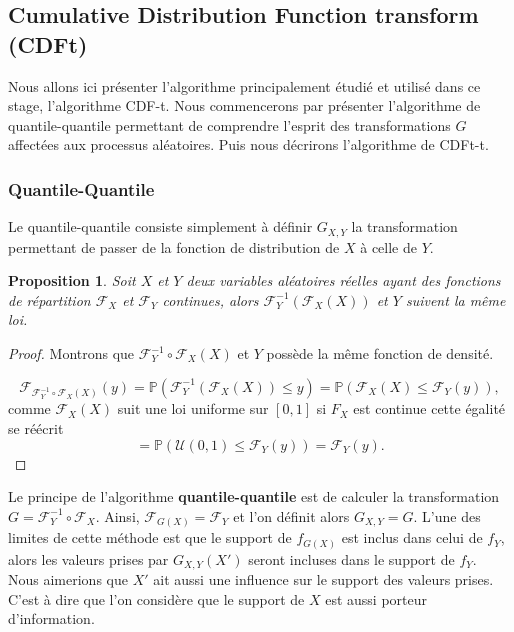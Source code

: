 \documentclass[a4paper,10pt]{article}
\newtheorem{proposition}{Proposition}
\begin{document}
	\subsection{Cumulative Distribution Function transform (CDFt)}
	\label{CDF-t}
	
	Nous allons ici présenter l'algorithme principalement étudié et utilisé dans ce stage, l'algorithme CDF-t. Nous commencerons par présenter l'algorithme de quantile-quantile permettant de comprendre l'esprit des transformations $G$ affectées aux processus aléatoires. Puis nous décrirons l'algorithme de CDFt-t. 
	
	\subsubsection{Quantile-Quantile}
	\label{Q-Q}
	Le quantile-quantile consiste simplement à définir $G_{X,Y}$ la transformation permettant de passer de la fonction de distribution de $X$ à celle de $Y$. 
	\begin{proposition}
		Soit $X$ et $Y$ deux variables aléatoires réelles ayant des fonctions de répartition $\mathcal{F}_{X}$ et $\mathcal{F}_{Y}$ continues, alors 
		$\mathcal{F}^{-1}_Y (\mathcal{F}_X(X))$ et $Y$ suivent la même loi. 
	\end{proposition}
	
	\begin{proof}
		Montrons que $\mathcal{F}^{-1}_Y \circ \mathcal{F}_X(X)$ et $Y$ possède la même fonction de densité. 
		
		\[\mathcal{F}_{\mathcal{F}^{-1}_Y \circ \mathcal{F}_X(X)}(y)
		= \mathbb{P}(\mathcal{F}^{-1}_Y (\mathcal{F}_X(X))\leq y )
		= \mathbb{P}(\mathcal{F}_{X}(X) \leq \mathcal{F}_Y(y)),\]
		comme $\mathcal{F}_{X}(X)$ suit une loi uniforme sur $[0,1]$ si $F_X$ est continue cette égalité se réécrit
		\[= \mathbb{P}(\mathcal{U}(0,1) \leq \mathcal{F}_Y(y))=\mathcal{F}_Y(y).\]
		
		
	\end{proof}
	Le principe de l'algorithme \textbf{quantile-quantile} est de calculer la transformation $G=\mathcal{F}^{-1}_{Y} \circ \mathcal{F}_{X}$. Ainsi, $\mathcal{F}_{G(X)}=\mathcal{F}_{Y}$ et l'on définit alors $G_{X,Y}=G$. L'une des limites de cette méthode est que le support de $f_{G(X)}$ est inclus dans celui de $f_{Y}$, alors les valeurs prises par $G
	_{X,Y}(X')$ seront incluses dans le support de $f_Y$. Nous aimerions que $X'$ ait aussi une influence sur le support des valeurs prises. C'est à dire que l'on considère que le support de $X$ est aussi porteur d'information.
	
\end{document}
